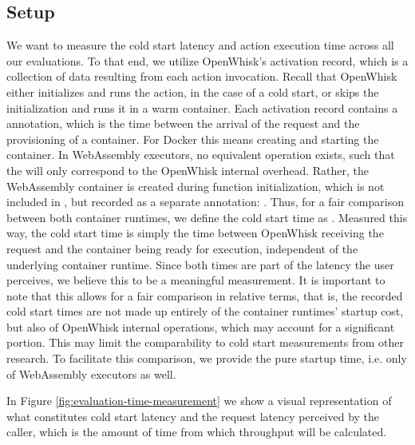 \subsection{Setup}

We want to measure the cold start latency and action execution time across all our evaluations. To that end, we utilize OpenWhisk's activation record, which is a collection of data resulting from each action invocation.  Recall that OpenWhisk either initializes and runs the action, in the case of a cold start, or skips the initialization and runs it in a warm container. Each activation record contains a  annotation, which is the time between the arrival of the request and the provisioning of a container. For Docker this means creating and starting the container. In WebAssembly executors, no equivalent operation exists, such that the  will only correspond to the OpenWhisk internal overhead. Rather, the WebAssembly container is created during function initialization, which is not included in , but recorded as a separate annotation: . Thus, for a fair comparison between both container runtimes, we define the cold start time as . Measured this way, the cold start time is simply the time between OpenWhisk receiving the request and the container being ready for execution, independent of the underlying container runtime. Since both times are part of the latency the user perceives, we believe this to be a meaningful measurement. It is important to note that this allows for a fair comparison in relative terms, that is, the recorded cold start times are not made up entirely of the container runtimes' startup cost, but also of OpenWhisk internal operations, which may account for a significant portion. This may limit the comparability to cold start measurements from other research. To facilitate this comparison, we provide the pure startup time, i.e. only  of WebAssembly executors as well.


In Figure \ref{fig:evaluation-time-measurement} we show a visual representation of what constitutes cold start latency and the request latency perceived by the caller, which is the amount of time from which throughput will be calculated.

